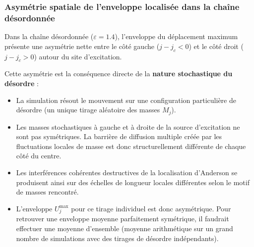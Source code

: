 \documentclass[11pt,a4paper]{article}
\begin{document}
\subsubsection{Asymétrie spatiale de l'enveloppe localisée dans la chaîne désordonnée}
Dans la chaîne désordonnée ($\varepsilon = 1.4$), l'enveloppe du déplacement maximum présente une asymétrie nette entre le côté gauche ($j - j_c < 0$) et le côté droit ($j - j_c > 0$) autour du site d'excitation.

Cette asymétrie est la conséquence directe de la \textbf{nature stochastique du désordre} :
\begin{itemize}
    \item La simulation résout le mouvement sur une configuration particulière de désordre (un unique tirage aléatoire des masses $M_j$).
    \item Les masses stochastiques à gauche et à droite de la source d'excitation ne sont pas symétriques. La barrière de diffusion multiple créée par les fluctuations locales de masse est donc structurellement différente de chaque côté du centre.
    \item Les interférences cohérentes destructives de la localisation d'Anderson se produisent ainsi sur des échelles de longueur locales différentes selon le motif de masses rencontré.
    \item L'enveloppe $U_j^{\max}$ pour ce tirage individuel est donc asymétrique. Pour retrouver une enveloppe moyenne parfaitement symétrique, il faudrait effectuer une moyenne d'ensemble (moyenne arithmétique sur un grand nombre de simulations avec des tirages de désordre indépendants).
\end{itemize}
\end{document}
